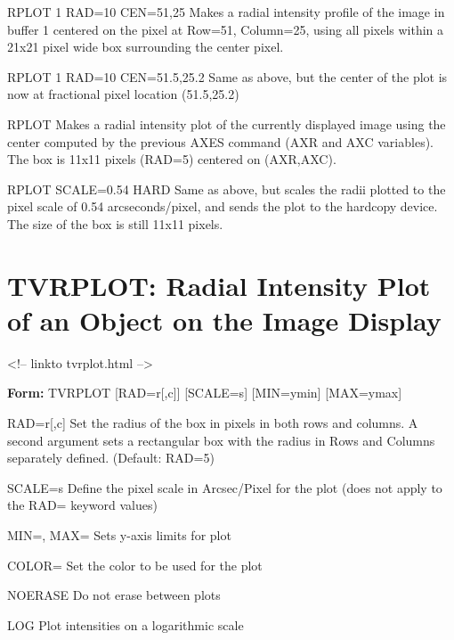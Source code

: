 \begin{example}
  \item[RPLOT 1 RAD=10 CEN=51,25\hfill]{
   Makes a radial intensity profile of the image in buffer 1 centered on
   the pixel at Row=51, Column=25, using all pixels within a 21x21 pixel
   wide box surrounding the center pixel.}
  \item[RPLOT 1 RAD=10 CEN=51.5,25.2\hfill]{
   Same as above, but the center of the plot is now at fractional pixel
   location (51.5,25.2)}
  \item[RPLOT\hfill]{
   Makes a radial intensity plot of the currently displayed image using
   the center computed by the previous AXES command (AXR and AXC variables).
   The box is 11x11 pixels (RAD=5) centered on (AXR,AXC).}
  \item[RPLOT SCALE=0.54 HARD\hfill]{
   Same as above, but scales the radii plotted to the pixel scale of 0.54
   arcseconds/pixel, and sends the plot to the hardcopy device.  The size
   of the box is still 11x11 pixels.}
\end{example}

\section{TVRPLOT: Radial Intensity Plot of an Object on the Image Display}
\begin{rawhtml}
<!-- linkto tvrplot.html -->
\end{rawhtml}
\begin{command}
  \item[\textbf{Form: } TVRPLOT {[RAD=r{[,c]}]} {[SCALE=s]} {[MIN=ymin]} 
       {[MAX=ymax]}\hfill]{}
  \item[RAD=r{[,c]}]{ Set the radius of the box in pixels in both rows 
       and columns.  A second argument sets a rectangular 
       box with the radius in Rows and Columns separately 
       defined.  (Default: RAD=5)}
  \item[SCALE=s]{   Define the pixel scale in Arcsec/Pixel for the plot
       (does not apply to the RAD= keyword values)}
  \item[MIN=, MAX=]{ Sets y-axis limits for plot}
  \item[COLOR=]{ Set the color to be used for the plot}
  \item[NOERASE]{ Do not erase between plots}
  \item[LOG]{ Plot intensities on a logarithmic scale}
\end{command}

